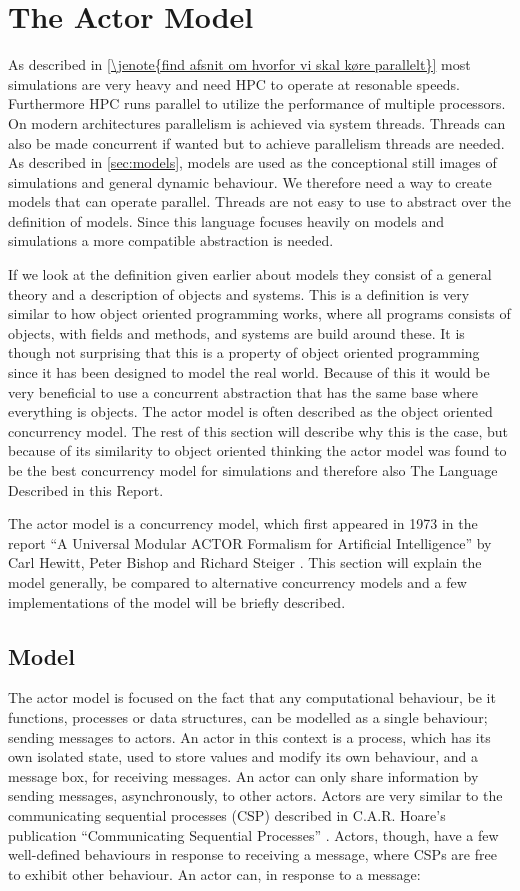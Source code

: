 \section{The Actor Model}
As described in \cref{\jenote{find afsnit om hvorfor vi skal køre parallelt}} most simulations are very heavy and need HPC to operate at resonable speeds. Furthermore HPC runs parallel to utilize the performance of multiple processors. On modern architectures parallelism is achieved via system threads. Threads can also be made concurrent if wanted but to achieve parallelism threads are needed. As described in \cref{sec:models}, models are used as the conceptional still images of simulations and general dynamic behaviour.  We therefore need a way to create models that can operate parallel. Threads are not easy to use to abstract over the definition of models. Since this language focuses heavily on models and simulations a more compatible abstraction is needed.

If we look at the definition given earlier about models they consist of a general theory and a description of objects and systems. This is a definition is very similar to how object oriented programming works, where all programs consists of objects, with fields and methods, and systems are build around these. It is though not surprising that this is a property of object oriented programming since it has been designed to model the real world.
Because of this it would be very beneficial to use a concurrent abstraction that has the same base where everything is objects.
The actor model is often described as the object oriented concurrency model. The rest of this section will describe why this is the case, but because of its similarity to object oriented thinking the actor model was found to be the best concurrency model for simulations and therefore also The Language Described in this Report.

The actor model is a concurrency model, which first appeared in 1973 in the report \enquote{A Universal Modular ACTOR Formalism for Artificial Intelligence} by Carl Hewitt, Peter Bishop and Richard Steiger \cite{Hewitt:1973}. This section will explain the model generally, be compared to alternative concurrency models and a few implementations of the model will be briefly described.

\subsection{Model}
The actor model is focused on the fact that any computational behaviour, be it functions, processes or data structures, can be modelled as a single behaviour; sending messages to actors.
An actor in this context is a process, which has its own isolated state, used to store values and modify its own behaviour, and a message box, for receiving messages. An actor can only share information by sending messages, asynchronously, to other actors.
Actors are very similar to the communicating sequential processes (CSP) described in C.A.R. Hoare's publication \enquote{Communicating Sequential Processes} \cite{hoare1985communicating}. Actors, though, have a few well-defined behaviours in response to receiving a message, where CSPs are free to exhibit other behaviour. An actor can, in response to a message: 


